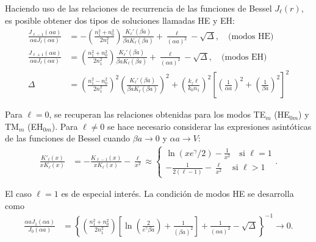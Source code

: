 Haciendo uso de las relaciones de recurrencia de las funciones de Bessel $J_\ell(r)$,  es posible obtener dos tipos de soluciones llamadas HE y EH:
\begin{align}
		\frac{J_{\ell-1}(\alpha a)}{\alpha a J_\ell(\alpha a)} &= -\left(\frac{n_1^2+n_0^2}{2n_1^2}\right) \frac{K_\ell'(\beta a)}{\beta a K_\ell(\beta a)}+\frac{\ell}{(\alpha a)^2}-\sqrt{\Delta}, \quad \text{(modos HE)}
		\label{eqn:HE}
	\\
		\frac{J_{\ell+1}(\alpha a)}{\alpha a J_\ell(\alpha a)} &= \left(\frac{n_1^2+n_0^2}{2n_1^2}\right) \frac{K_\ell'(\beta a)}{\beta a K_\ell(\beta a)}+\frac{\ell}{(\alpha a)^2}-\sqrt{\Delta}, \quad \text{(modos EH)}
		\label{eqn:EH}
		\\
		\Delta &= \left(\frac{n_1^2-n_0^2}{2n_1^2}\right)^2\left(\frac{K_\ell'(\beta a)}{\beta a K_\ell(\beta a)}\right)^2+ \left( \frac{ k_z \ell}{ k_0 n_1} \right)^2\left[ \left(\frac{1}{\alpha a}\right)^2 + \left(\frac{1}{\beta a}\right)^2 \right]^2 \nonumber
\end{align}

Para $\ell = 0$, se recuperan las relaciones obtenidas para los modos  TE$_m$ (HE$_{0m}$) y TM$_m$ (EH$_{0m}$). Para $\ell \neq 0$ se hace necesario considerar las expresiones asintóticas de las funciones de Bessel cuando $\beta a \to 0$ y $\alpha a \to V$:
\begin{align*}
	\frac{K'_\ell (x)}{xK_\ell (x)} &= -\frac{K_{\ell-1} (x)}{xK_\ell (x)}-\frac{\ell}{x^2}\approx \left\{\begin{matrix}
	\ln(xe^\gamma/2)-\frac{1}{x^2} \quad\text{si }\ell = 1
	\\
	-\frac{
	1}{2(\ell-1)}-\frac{\ell}{x^2}\quad \text{si }\ell > 1
	\end{matrix}\right. .
\end{align*}


El caso $\ell=1$ es de especial interés. La condición de modos HE se desarrolla como
\begin{align*}
	\frac{\alpha a J_1(\alpha a)}{J_0(\alpha a)} &= \left\{\left(\frac{n_1^2+n_0^2}{2n_1^2}\right) \left[ \ln\left(\frac{2}{e^\gamma \beta a}\right)+\frac{1}{(\beta a)^2} \right]+\frac{1}{(\alpha a)^2}-\sqrt{\Delta}\right\}^{-1} \to 0.
\end{align*}

